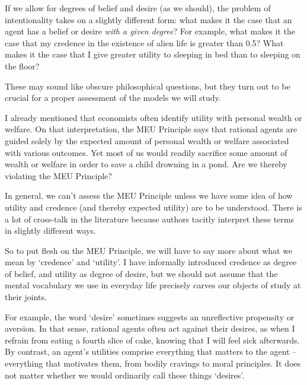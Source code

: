 If we allow for degrees of belief and desire (as we should), the
problem of intentionality takes on a slightly different form: what
makes it the case that an agent has a belief or desire \emph{with a
  given degree}? For example, what makes it the case that my credence
in the existence of alien life is greater than 0.5? What makes it the
case that I give greater utility to sleeping in bed than to sleeping
on the floor?

These may sound like obscure philosophical questions, but they turn
out to be crucial for a proper assessment of the models we will study.

I already mentioned that economists often identify utility with
personal wealth or welfare. On that interpretation, the MEU
Principle says that rational agents are guided solely by the expected
amount of personal wealth or welfare associated with various
outcomes. Yet most of us would readily sacrifice some amount of wealth
or welfare in order to save a child drowning in a pond. Are we
thereby violating the MEU Principle? 

In general, we can't assess the MEU Principle unless we have some idea
of how utility and credence (and thereby expected utility) are to be
understood. There is a lot of cross-talk in the literature because
authors tacitly interpret these terms in slightly different ways.

So to put flesh on the MEU Principle, we will have to say more about
what we mean by `credence' and `utility'. I have informally introduced
credence as degree of belief, and utility as degree of desire, but we
should not assume that the mental vocabulary we use in everyday life
precisely carves our objects of study at their joints. 

For example, the word `desire' sometimes suggests an unreflective
propensity or aversion. In that sense, rational agents often act
against their desires, as when I refrain from eating a fourth slice of
cake, knowing that I will feel sick afterwards. By contrast, an
agent's utilities comprise everything that matters to the agent --
everything that motivates them, from bodily cravings to moral
principles. It does not matter whether we would ordinarily call these
things `desires'.

